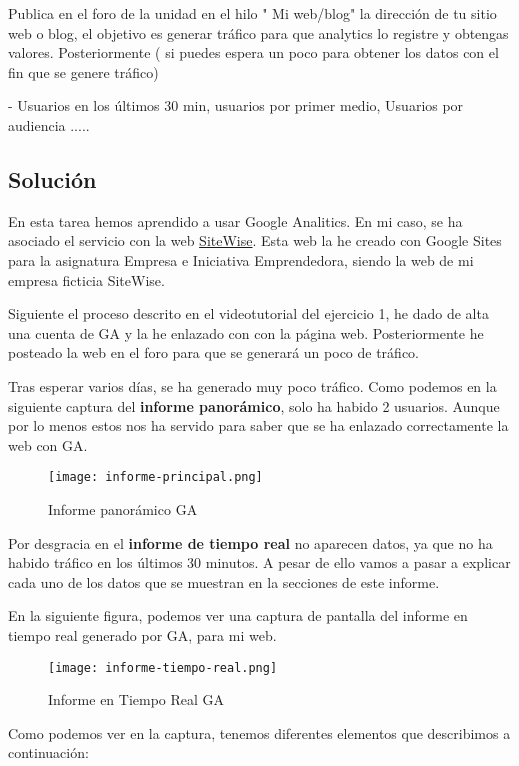 Publica en el foro de la unidad en el hilo " Mi web/blog"  la dirección de tu sitio web o blog, el objetivo es generar tráfico para que analytics lo registre y obtengas valores. Posteriormente ( si puedes espera un poco para obtener los datos con el fin que se genere tráfico)

- Usuarios en los últimos 30 min, usuarios por primer medio, Usuarios por audiencia .....

\subsection{Solución}
En esta tarea hemos aprendido a usar Google Analitics. En mi caso, se ha asociado el servicio con la web \href{https://sites.google.com/view/sitewise/inicio}{SiteWise}. Esta web la he creado con Google Sites para la asignatura Empresa e Iniciativa Emprendedora, siendo la web de mi empresa ficticia SiteWise.

Siguiente el proceso descrito en el videotutorial del ejercicio 1, he dado de alta una cuenta de GA y la he enlazado con con la página web. Posteriormente he posteado la web en el foro para que se generará un poco de tráfico.

Tras esperar varios días, se ha generado muy poco tráfico. Como podemos en la siguiente captura del \textbf{informe panorámico}, solo ha habido 2 usuarios. Aunque por lo menos estos nos ha servido para saber que se ha enlazado correctamente la web con GA.

\begin{figure}[H]
    \centering
    \texttt{[image: informe-principal.png]}
    \caption{Informe panorámico GA}
\end{figure}

Por desgracia en el \textbf{informe de tiempo real} no aparecen datos, ya que no ha habido tráfico en los últimos 30 minutos. A pesar de ello vamos a pasar a explicar cada uno de los datos que se muestran en la secciones de este informe.

En la siguiente figura, podemos ver una captura de pantalla del informe en tiempo real generado por GA, para mi web.

\begin{figure}[H]
    \centering
    \texttt{[image: informe-tiempo-real.png]}
    \caption{Informe en Tiempo Real GA}
\end{figure}

Como podemos ver en la captura, tenemos diferentes elementos que describimos a continuación:

